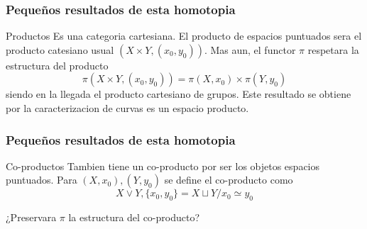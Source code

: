 \documentclass[xetex,mathserif,serif]{beamer}
\begin{document}
  \begin{frame}
    \frametitle{Pequeños resultados de esta homotopia}
    \begin{block}{Productos}
      Es una categoria cartesiana. El producto de espacios puntuados
      sera el producto catesiano usual \((X \times Y, (x_0, y_0))\). Mas
      aun, el functor \(\pi\) respetara la estructura del producto
      \[ \pi (X \times Y , (x_0, y_0)) = \pi (X, x_0) \times \pi (Y,
        y_0)\]
      siendo en la llegada el producto cartesiano de grupos. Este
      resultado se obtiene por la caracterizacion de curvas es un
      espacio producto.
    \end{block}
  \end{frame}
  \begin{frame}
    \frametitle{Pequeños resultados de esta homotopia}
    \begin{block}{Co-productos}
      Tambien tiene un co-producto por ser los objetos espacios
      puntuados. Para \((X, x_0) , (Y, y_0)\) se define el co-producto
      como
      \[ X \vee Y , \{x_0, y_0\} = X \sqcup Y / x_0 \simeq y_0 \]
    \end{block}
    \begin{block}{}
      ¿Preservara \(\pi\) la estructura del co-producto?
    \end{block}
  \end{frame}
\end{document}
